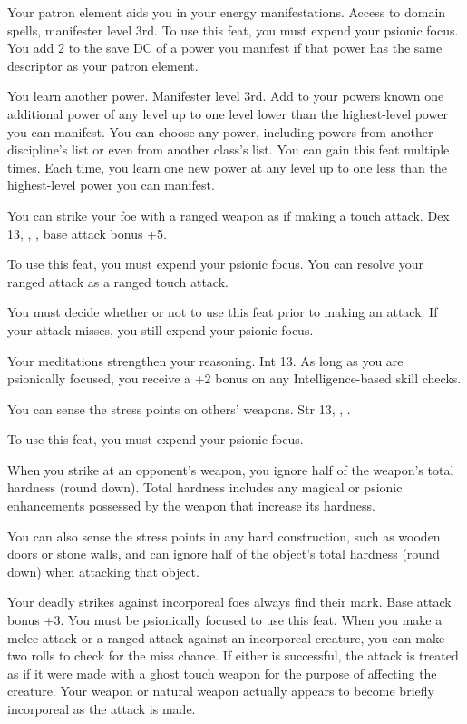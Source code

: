 {Your patron element aids you in your energy manifestations.}
{Access to domain spells, manifester level 3rd.}
{To use this feat, you must expend your psionic focus. You add 2 to the save DC of a power you manifest if that power has the same descriptor as your patron element.}
{}{}

{You learn another power.}
{Manifester level 3rd.}
{Add to your powers known one additional power of any level up to one level lower than the highest-level power you can manifest. You can choose any power, including powers from another discipline's list or even from another class's list.}
{}
{You can gain this feat multiple times. Each time, you learn one new power at any level up to one less than the highest-level power you can manifest.}

{You can strike your foe with a ranged weapon as if making a touch attack.}
{Dex 13, , , base attack bonus +5.}
{To use this feat, you must expend your psionic focus. You can resolve your ranged attack as a ranged touch attack.

You must decide whether or not to use this feat prior to making an attack. If your attack misses, you still expend your psionic focus.}
{}{}

{Your meditations strengthen your reasoning.}
{Int 13.}
{As long as you are psionically focused, you receive a +2 bonus on any Intelligence-based skill checks.}
{}{}

{You can sense the stress points on others' weapons.}
{Str 13, , .}
{To use this feat, you must expend your psionic focus.

When you strike at an opponent's weapon, you ignore half of the weapon's total hardness (round down). Total hardness includes any magical or psionic enhancements possessed by the weapon that increase its hardness.}
{}
{You can also sense the stress points in any hard construction, such as wooden doors or stone walls, and can ignore half of the object's total hardness (round down) when attacking that object.}

{Your deadly strikes against incorporeal foes always find their mark.}
{Base attack bonus +3.}
{You must be psionically focused to use this feat. When you make a melee attack or a ranged attack against an incorporeal creature, you can make two rolls to check for the miss chance. If either is successful, the attack is treated as if it were made with a ghost touch weapon for the purpose of affecting the creature. Your weapon or natural weapon actually appears to become briefly incorporeal as the attack is made.}
{}{}

